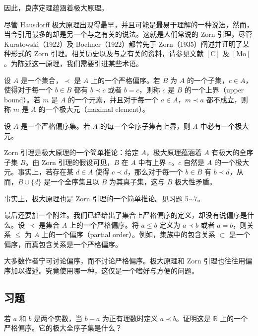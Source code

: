 \documentclass[../../main.tex]{subfiles}
\begin{document}
因此，良序定理蕴涵着极大原理。

尽管 Hausdorff 极大原理出现得最早，并且可能是最易于理解的一种说法，然而，当今引用最多的却是另一个与之有关的说法。这就是人们常说的 Zorn 引理，尽管 Kuratowski（1922）及 Bochner（1922）都曾先于 Zorn（1935）阐述并证明了某种形式的 Zorn 引理。相关历史以及与之有关的资料，请参见文献 $[\mathrm{C}]$ 及 $[\mathrm{Mo}]$。为陈述这一原理，我们需要引进某些术语。

\begin{definition}[上界与极大元]\label{definition:ch01-上界极大元}
设 $A$ 是一个集合，$\prec$ 是 $A$ 上的一个严格偏序。若 $B$ 为 $A$ 的一个子集，$c \in A$，使得对于每一个 $b \in B$ 都有 $b \prec c$ 或者 $b = c$，则称 $c$ 是 $B$ 的一个上界（upper bound）。若 $m$ 是 $A$ 的一个元素，并且对于每一个 $a \in A$，$m \prec a$ 都不成立，则称 $m$ 是 $A$ 的一个极大元（maximal element）。
\end{definition}

\begin{axiom}[Zorn 引理]\label{axiom:ch01-Zorn}
设 $A$ 是一个严格偏序集。若 $A$ 的每一个全序子集有上界，则 $A$ 中必有一个极大元。
\end{axiom}

Zorn 引理是极大原理的一个简单推论：给定 $A$，极大原理蕴涵着 $A$ 有极大的全序子集 $B$。由 Zorn 引理的假设可见，$B$ 在 $A$ 中有上界 $c$。$c$ 自然是 $A$ 的一个极大元。事实上，若存在某 $d \in A$ 使得 $c \prec d$，那么对于每一个 $b \in B$ 有 $b \prec d$，从而，$B \cup \{d\}$ 是一个全序集且以 $B$ 为其真子集，这与 $B$ 极大性矛盾。

事实上，极大原理也是 Zorn 引理的一个简单推论。见习题 5$\sim$7。

最后还要加一个附注。我们已经给出了集合上严格偏序的定义，却没有说偏序是什么。设 $\prec$ 是集合 $A$ 上的一个严格偏序。将 $a \leqslant b$ 定义为 $a \prec b$ 或者 $a = b$，则关系 $\leqslant$ 为 $A$ 上的一个偏序（partial order）。例如，集族中的包含关系 $\subset$ 是一个偏序，而真包含关系是一个严格偏序。

大多数作者宁可讨论偏序，而不讨论严格偏序。极大原理和 Zorn 引理也往往用偏序加以描述。究竟使用哪一种，这仅是一个嗜好与方便的问题。

\subsection*{习题}

\begin{exercise}\label{exercise:ch01-极大原理-1}
若 $a$ 和 $b$ 是两个实数，当 $b - a$ 为正有理数时定义 $a \prec b$。证明这是 $\mathbb{R}$ 上的一个严格偏序。它的极大全序子集是什么？
\end{exercise}
\end{document}
